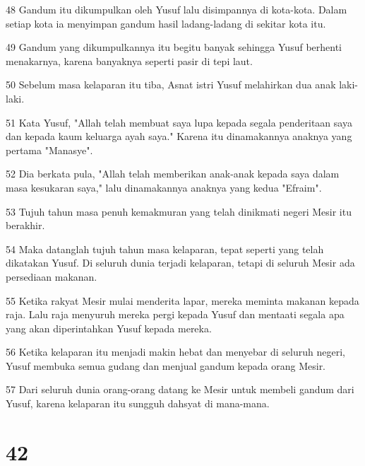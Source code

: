 \par 48 Gandum itu dikumpulkan oleh Yusuf lalu disimpannya di kota-kota. Dalam setiap kota ia menyimpan gandum hasil ladang-ladang di sekitar kota itu.
\par 49 Gandum yang dikumpulkannya itu begitu banyak sehingga Yusuf berhenti menakarnya, karena banyaknya seperti pasir di tepi laut.
\par 50 Sebelum masa kelaparan itu tiba, Asnat istri Yusuf melahirkan dua anak laki-laki.
\par 51 Kata Yusuf, "Allah telah membuat saya lupa kepada segala penderitaan saya dan kepada kaum keluarga ayah saya." Karena itu dinamakannya anaknya yang pertama "Manasye".
\par 52 Dia berkata pula, "Allah telah memberikan anak-anak kepada saya dalam masa kesukaran saya," lalu dinamakannya anaknya yang kedua "Efraim".
\par 53 Tujuh tahun masa penuh kemakmuran yang telah dinikmati negeri Mesir itu berakhir.
\par 54 Maka datanglah tujuh tahun masa kelaparan, tepat seperti yang telah dikatakan Yusuf. Di seluruh dunia terjadi kelaparan, tetapi di seluruh Mesir ada persediaan makanan.
\par 55 Ketika rakyat Mesir mulai menderita lapar, mereka meminta makanan kepada raja. Lalu raja menyuruh mereka pergi kepada Yusuf dan mentaati segala apa yang akan diperintahkan Yusuf kepada mereka.
\par 56 Ketika kelaparan itu menjadi makin hebat dan menyebar di seluruh negeri, Yusuf membuka semua gudang dan menjual gandum kepada orang Mesir.
\par 57 Dari seluruh dunia orang-orang datang ke Mesir untuk membeli gandum dari Yusuf, karena kelaparan itu sungguh dahsyat di mana-mana.

\chapter{42}

